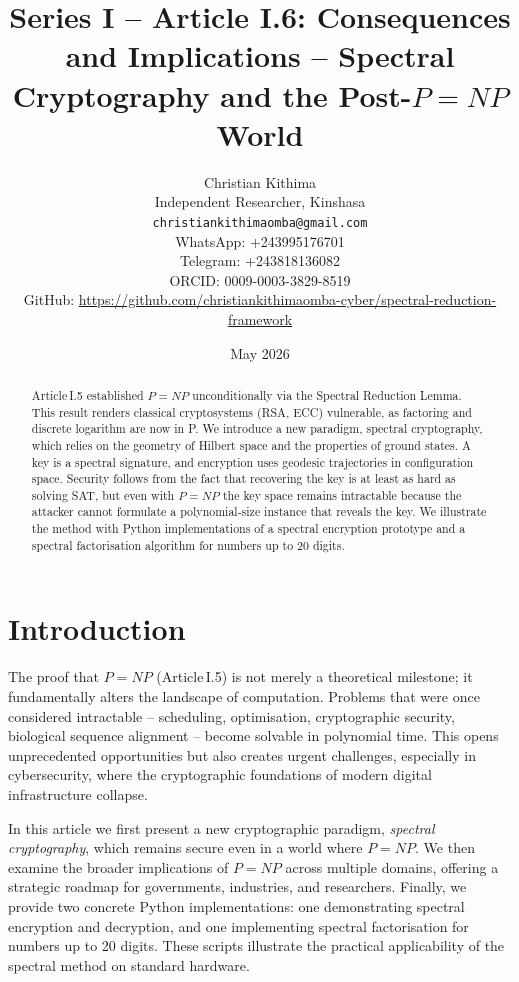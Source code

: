 \documentclass[11pt,a4paper]{article}
\title{Series I – Article I.6: Consequences and Implications – Spectral Cryptography and the Post-\(P = NP\) World}
\author{Christian Kithima \\
Independent Researcher, Kinshasa \\
\texttt{christiankithimaomba@gmail.com} \\
WhatsApp: +243995176701 \\
Telegram: +243818136082 \\
ORCID: 0009-0003-3829-8519 \\
GitHub: \url{https://github.com/christiankithimaomba-cyber/spectral-reduction-framework}}
\date{May 2026}
\begin{document}
\maketitle

\begin{abstract}
Article I.5 established \(P = NP\) unconditionally via the Spectral Reduction Lemma. This result renders classical cryptosystems (RSA, ECC) vulnerable, as factoring and discrete logarithm are now in P. We introduce a new paradigm, spectral cryptography, which relies on the geometry of Hilbert space and the properties of ground states. A key is a spectral signature, and encryption uses geodesic trajectories in configuration space. Security follows from the fact that recovering the key is at least as hard as solving SAT, but even with \(P = NP\) the key space remains intractable because the attacker cannot formulate a polynomial‑size instance that reveals the key. We illustrate the method with Python implementations of a spectral encryption prototype and a spectral factorisation algorithm for numbers up to 20 digits.
\end{abstract}

\tableofcontents

\section{Introduction}

The proof that \(P = NP\) (Article I.5) is not merely a theoretical milestone; it fundamentally alters the landscape of computation. Problems that were once considered intractable – scheduling, optimisation, cryptographic security, biological sequence alignment – become solvable in polynomial time. This opens unprecedented opportunities but also creates urgent challenges, especially in cybersecurity, where the cryptographic foundations of modern digital infrastructure collapse.

In this article we first present a new cryptographic paradigm, \emph{spectral cryptography}, which remains secure even in a world where \(P = NP\). We then examine the broader implications of \(P = NP\) across multiple domains, offering a strategic roadmap for governments, industries, and researchers. Finally, we provide two concrete Python implementations: one demonstrating spectral encryption and decryption, and one implementing spectral factorisation for numbers up to 20 digits. These scripts illustrate the practical applicability of the spectral method on standard hardware.
\end{document}
